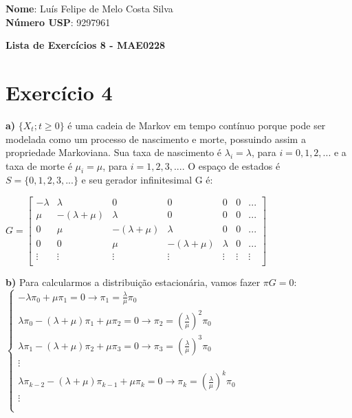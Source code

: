 \documentclass[12pt]{article}
\begin{document}
	
	\textbf{Nome}: Luís Felipe de Melo Costa Silva \\
	\textbf{Número USP}: 9297961 
	
	\begin{center}
		\LARGE \bf
		Lista de Exercícios 8 - MAE0228
	\end{center}
	 
	\section*{Exercício 4}
	
	\textbf{a)}  $ \{X_t; t\geq0\} $ é uma cadeia de Markov em tempo contínuo porque pode ser modelada como um processo de nascimento e morte, possuindo assim a propriedade Markoviana. Sua taxa de nascimento é $ \lambda_i = \lambda $, para $ i = 0, 1, 2, ... $ e a taxa de morte é $ \mu_i = \mu $, para $ i = 1, 2, 3, ... $. O espaço de estados é $ S=\{0, 1, 2, 3, ...\} $ e seu gerador infinitesimal G é:
	
	\begin{center}
		$
		G = \left[\begin{array}{ccccccc}
		        -\lambda  & \lambda          & 0                & 0                & 0       & 0      & ...    \\
		        \mu       &  -(\lambda+\mu)  & \lambda          & 0                & 0       & 0      & ...    \\
		        0         & \mu              &  -(\lambda+\mu)  & \lambda          & 0       & 0      & ...    \\
		        0         & 0                & \mu              &  -(\lambda+\mu)  & \lambda & 0      & ...    \\ 
		        \vdots    & \vdots           & \vdots           &  \vdots          & \vdots  & \vdots & \vdots \\
		    \end{array}\right]
		$
	\end{center}
	
	\textbf{b)} Para calcularmos a distribuição estacionária, vamos fazer $ \pi G = 0 $:\\
	
	$ \begin{cases}
		-\lambda \pi_0 + \mu \pi_1 = 0 \to \pi_1 = \frac{\lambda}{\mu} \pi_0\\
		\lambda \pi_0 -(\lambda+\mu) \pi_1 + \mu \pi_2 = 0 \to \pi_2 = \left(\frac{\lambda}{\mu}\right)^2 \pi_0\\
		\lambda \pi_1 -(\lambda+\mu) \pi_2 + \mu \pi_3 = 0 \to \pi_3 = \left(\frac{\lambda}{\mu}\right)^3 \pi_0\\
		\vdots \\
		\lambda \pi_{k-2} -(\lambda+\mu) \pi_{k-1} + \mu \pi_k = 0 \to \pi_k = \left(\frac{\lambda}{\mu}\right)^k \pi_0\\
		\vdots \\ \\
	\end{cases} $
	
\end{document}

